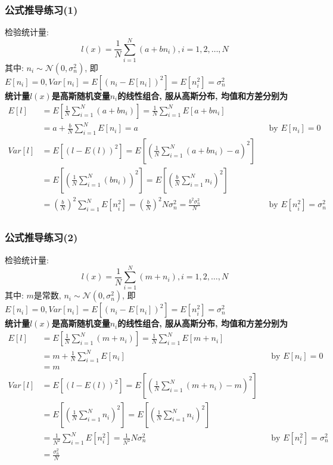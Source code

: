 \begin{frame}[shrink]
\frametitle{公式推导练习(1)}
检验统计量:
\[l(x)=\frac{1}{N}\sum\limits_{i=1}^{N}(a+bn_i), i=1,2,\dots,N\]
其中: $n_i\sim\mathcal{N}(0,\sigma_n^2)$, 即$E[n_i]=0,Var[n_i]=E\left[(n_i-E[n_i])^2\right]=E[n_i^2]=\sigma_n^2$\\
\textbf{统计量$l(x)$是高斯随机变量$n_i$的线性组合, 服从高斯分布, 均值和方差分别为}
\begin{align*}
E[l]&=E\left[\frac{1}{N}\sum\limits_{i=1}^{N}(a+bn_i)\right]=\frac{1}{N}\sum\limits_{i=1}^{N}E[a+bn_i]\\
&=a+\frac{b}{N}\sum\limits_{i=1}^{N}E[n_i]=a &&\text{by } E[n_i]=0\\
Var[l]&=E[(l-E(l))^2]=E\left[\left(\frac{1}{N}\sum\limits_{i=1}^{N}(a+bn_i)-a\right)^2\right]\\
&=E\left[\left(\frac{1}{N}\sum\limits_{i=1}^{N}(bn_i)\right)^2\right]=E\left[\left(\frac{b}{N}\sum\limits_{i=1}^{N}n_i\right)^2\right]\\
&=\left(\frac{b}{N}\right)^2\sum\limits_{i=1}^{N}E[n_i^2]=\left(\frac{b}{N}\right)^2N\sigma_n^2=\frac{b^2\sigma_n^2}{N} &&\text{by } E[n_i^2]=\sigma_n^2\\
\end{align*}
\end{frame}

\begin{frame}[shrink]
\frametitle{公式推导练习(2)}
检验统计量:
\[l(x)=\frac{1}{N}\sum\limits_{i=1}^{N}(m+n_i),i=1,2,\dots,N\]
其中: $m$是常数, $n_i\sim\mathcal{N}(0,\sigma_n^2)$, 即$E[n_i]=0,Var[n_i]=E\left[(n_i-E[n_i])^2\right]=E[n_i^2]=\sigma_n^2$\\
\textbf{统计量$l(x)$是高斯随机变量$n_i$的线性组合, 服从高斯分布, 均值和方差分别为}
\begin{align*}
E[l]&=E\left[\frac{1}{N}\sum\limits_{i=1}^{N}(m+n_i)\right]=\frac{1}{N}\sum\limits_{i=1}^{N}E[m+n_i]\\
&=m+\frac{1}{N}\sum\limits_{i=1}^{N}E[n_i] &&\text{by } E[n_i]=0\\
&=m\\
Var[l]&=E[(l-E(l))^2]=E\left[\left(\frac{1}{N}\sum\limits_{i=1}^{N}(m+n_i)-m\right)^2\right]\\
&=E\left[\left(\frac{1}{N}\sum\limits_{i=1}^{N}n_i\right)^2\right]=E\left[\left(\frac{1}{N}\sum\limits_{i=1}^{N}n_i\right)^2\right]\\
&=\frac{1}{N^2}\sum\limits_{i=1}^{N}E[n_i^2]=\frac{1}{N^2}N\sigma_n^2 &&\text{by } E[n_i^2]=\sigma_n^2\\
&=\frac{\sigma_n^2}{N}
\end{align*}
\end{frame}

